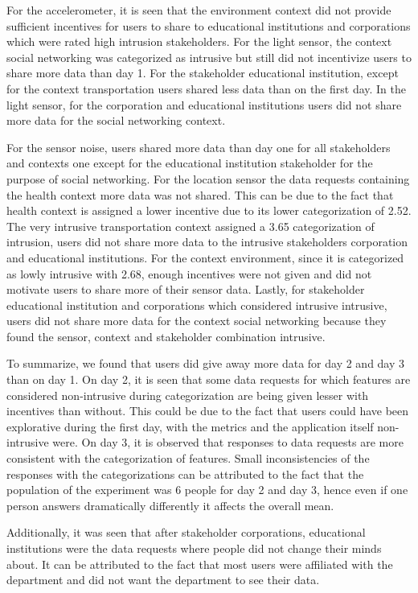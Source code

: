 For the accelerometer, it is seen that the environment context did not provide sufficient incentives for users to share to educational institutions and corporations which were rated high intrusion stakeholders. For the light sensor, the context social networking was categorized as intrusive but still did not incentivize users to share more data than day 1. For the stakeholder educational institution, except for the context transportation users shared less data than on the first day. In the light sensor, for the corporation and educational institutions users did not share more data for the social networking context. 

For the sensor noise, users shared more data than day one for all stakeholders and contexts one except for the educational institution stakeholder for the purpose of social networking. For the location sensor the data requests containing the health context more data was not shared. This can be due to the fact that health context is assigned a lower incentive due to its lower categorization of 2.52. The very intrusive transportation context assigned a 3.65 categorization of intrusion, users did not share more data to the intrusive stakeholders corporation and educational institutions. For the context environment, since it is categorized as lowly intrusive with 2.68, enough incentives were not given and did not motivate users to share more of their sensor data. Lastly, for stakeholder educational institution and corporations which considered intrusive intrusive, users did not share more data for the context social networking because they found the sensor, context and stakeholder combination intrusive.

To summarize, we found that users did give away more data for day 2 and day 3 than on day 1. On day 2, it is seen that some data requests for which features are considered non-intrusive during categorization are being given lesser with incentives than without. This could be due to the fact that users could have been explorative during the first day, with the metrics and the application itself non-intrusive were. On day 3, it is observed that responses to data requests are more consistent with the categorization of features. Small inconsistencies of the responses with the categorizations can be attributed to the fact that the population of the experiment was 6 people for day 2 and day 3, hence even if one person answers dramatically differently it affects the overall mean.

Additionally, it was seen that after stakeholder corporations, educational institutions were the data requests where people did not change their minds about. It can be attributed to the fact that most users were affiliated with the department and did not want the department to see their data.

